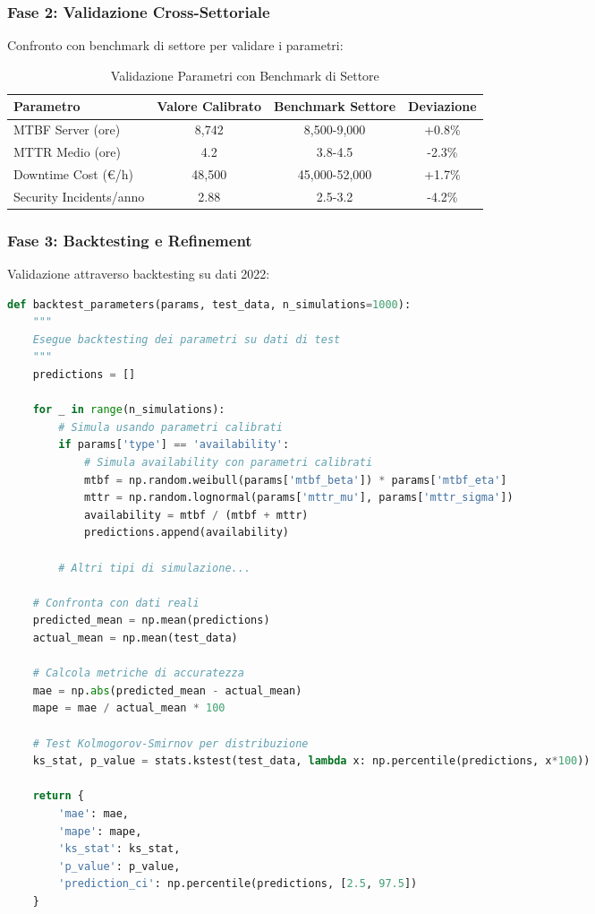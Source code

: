\subsubsection{Fase 2: Validazione Cross-Settoriale}

Confronto con benchmark di settore per validare i parametri:

\begin{table}[htbp]
\centering
\caption{Validazione Parametri con Benchmark di Settore}
\label{tab:validazione_parametri}
\begin{tabular}{lccc}
\toprule
\textbf{Parametro} & \textbf{Valore Calibrato} & \textbf{Benchmark Settore} & \textbf{Deviazione} \\
\midrule
MTBF Server (ore) & 8,742 & 8,500-9,000 & +0.8\% \\
MTTR Medio (ore) & 4.2 & 3.8-4.5 & -2.3\% \\
Downtime Cost (€/h) & 48,500 & 45,000-52,000 & +1.7\% \\
Security Incidents/anno & 2.88 & 2.5-3.2 & -4.2\% \\
\bottomrule
\end{tabular}
\end{table}

\subsubsection{Fase 3: Backtesting e Refinement}

Validazione attraverso backtesting su dati 2022:

\begin{lstlisting}[language=Python, caption=Backtesting dei Parametri]
def backtest_parameters(params, test_data, n_simulations=1000):
    """
    Esegue backtesting dei parametri su dati di test
    """
    predictions = []
    
    for _ in range(n_simulations):
        # Simula usando parametri calibrati
        if params['type'] == 'availability':
            # Simula availability con parametri calibrati
            mtbf = np.random.weibull(params['mtbf_beta']) * params['mtbf_eta']
            mttr = np.random.lognormal(params['mttr_mu'], params['mttr_sigma'])
            availability = mtbf / (mtbf + mttr)
            predictions.append(availability)
        
        # Altri tipi di simulazione...
    
    # Confronta con dati reali
    predicted_mean = np.mean(predictions)
    actual_mean = np.mean(test_data)
    
    # Calcola metriche di accuratezza
    mae = np.abs(predicted_mean - actual_mean)
    mape = mae / actual_mean * 100
    
    # Test Kolmogorov-Smirnov per distribuzione
    ks_stat, p_value = stats.kstest(test_data, lambda x: np.percentile(predictions, x*100))
    
    return {
        'mae': mae,
        'mape': mape,
        'ks_stat': ks_stat,
        'p_value': p_value,
        'prediction_ci': np.percentile(predictions, [2.5, 97.5])
    }
\end{lstlisting}

